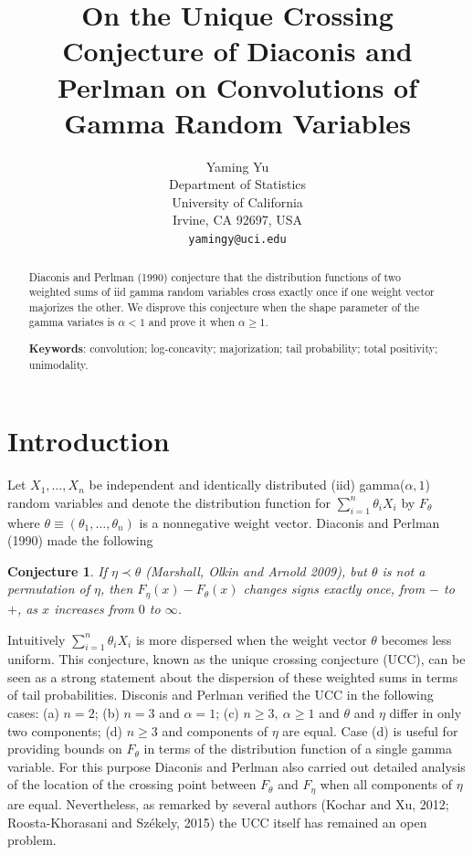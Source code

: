 \documentclass[11pt]{article}
\newtheorem{conjecture}{\bf Conjecture}
\begin{document}
\title{On the Unique Crossing Conjecture of Diaconis and Perlman on Convolutions of Gamma Random Variables}

\author{Yaming Yu\\
\small Department of Statistics\\[-0.8ex]
\small University of California\\[-0.8ex] 
\small Irvine, CA 92697, USA\\[-0.8ex]
\small \texttt{yamingy@uci.edu}}

\date{}
\maketitle

\begin{abstract}
Diaconis and Perlman (1990) conjecture that the distribution functions of two weighted sums of iid gamma random variables cross exactly once if one weight vector majorizes the other.  We disprove this conjecture when the shape parameter of the gamma variates is $\alpha <1$ and prove it when $\alpha\geq 1$.

{\bf Keywords}: convolution; log-concavity; majorization; tail probability; total positivity; unimodality.
\end{abstract}

\section{Introduction}
Let $X_1,\ldots, X_n$ be independent and identically distributed (iid) gamma($\alpha, 1$) random variables and denote the distribution function for $\sum_{i=1}^n \theta_i X_i$ by $F_\theta$ where $\theta \equiv (\theta_1,\ldots, \theta_n)$ is a nonnegative weight vector.  Diaconis and Perlman (1990) made the following 
\begin{conjecture}
\label{conj1}
If $\eta\prec \theta$ (Marshall, Olkin and Arnold 2009), but $\theta$ is not a permutation of $\eta$, then $F_\eta(x) -F_\theta(x)$ changes signs exactly once, from $-$ to $+$, as $x$ increases from $0$ to $\infty$.  
 \end{conjecture}
 Intuitively $\sum_{i=1}^n \theta_i X_i$ is more dispersed when the weight vector $\theta$ becomes less uniform.  This conjecture, known as the unique crossing conjecture (UCC), can be seen as a strong statement about the dispersion of these weighted sums in terms of tail probabilities.  Disconis and Perlman verified the UCC in the following cases: (a) $n=2$; (b) $n=3$ and $\alpha=1$; (c) $n\geq 3,\ \alpha\geq 1$ and $\theta$ and $\eta$ differ in only two components; (d) $n\geq 3$ and components of $\eta$ are equal.  Case (d) is useful for providing bounds on $F_\theta$ in terms of the distribution function of a single gamma variable.  For this purpose Diaconis and Perlman also carried out detailed analysis of the location of the crossing point between $F_\theta$ and $F_\eta$ when all components of $\eta$ are equal.  Nevertheless, as remarked by several authors (Kochar and Xu, 2012; Roosta-Khorasani and Sz\'{e}kely, 2015) the UCC itself has remained an open problem. 
\end{document}
